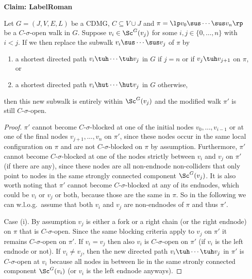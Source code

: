 \noindent\textbf{Claim: LabelRoman}\par\smallskip
{\appendixTexSize
\label{lem:replace_walk}
Let $G=(J,V,E,L)$ be a CDMG, $C \subseteq V \cup J$ and $\pi = \lp  v_0 \sus \cdots \sus v_n \rp$ be a $C$-$\sigma$-open walk in $G$.
  Suppose $v_i \in \Sc^G(v_j)$ for some $i,j \in \{0,\dots,n\}$ with $i < j$.
If we then replace the subwalk $v_i \sus \cdots \sus v_j$ of $\pi$ by 
  \begin{enumerate}[label=(\roman*)]
      \item a shortest directed path $v_i \tuh \cdots \tuh v_j$ in $G$ if $j = n$ or if $v_j \tuh v_{j+1}$ on $\pi$, or 
    \item a shortest directed path $v_i \hut \cdots \hut v_j$ in $G$ otherwise,
  \end{enumerate}
  then this new subwalk is entirely within $\Sc^G(v_j)$ and the modified walk $\pi'$ is still $C$-$\sigma$-open.
\begin{proof}
$\pi'$ cannot become $C$-$\sigma$-blocked at one of the initial nodes $v_0, \dots, v_{i-1}$ or at one of the final nodes $v_{j+1}, \dots, v_n$ on $\pi'$, since these nodes occur in the same local configuration on $\pi$ and are not $C$-$\sigma$-blocked on $\pi$ by assumption.
Furthermore, $\pi'$ cannot become $C$-$\sigma$-blocked at one of the nodes strictly between $v_i$ and $v_j$ on $\pi'$ (if there are any), since these nodes are all non-endnode non-colliders that only point to nodes in the same strongly connected component $\Sc^G(v_j)$. It is also worth noting that $\pi'$ cannot become $C$-$\sigma$-blocked at any of its endnodes, which could be $v_i$ or $v_j$ or both, because those are the same in $\pi$. So in the following we can w.l.o.g.\ assume that both $v_i$ and $v_j$ are non-endnodes of $\pi$ and thus $\pi'$.

Case (i). By assumption $v_j$ is either a fork or a right chain (or the right endnode) on $\pi$ that is $C$-$\sigma$-open. Since the same blocking criteria apply to $v_j$ on $\pi'$ it remains $C$-$\sigma$-open on $\pi'$. If $v_i=v_j$ then also $v_i$ is $C$-$\sigma$-open on $\pi'$ (if $v_i$ is the left endnode or not). If $v_i \neq v_j$, then the new directed path $v_i \tuh \cdots \tuh v_j$ in $\pi'$ is $C$-$\sigma$-open at $v_i$ because all nodes in between lie in the same stronly connected component $\Sc^G(v_i)$ (or $v_i$ is the left endnode anyways).


\end{proof}}
